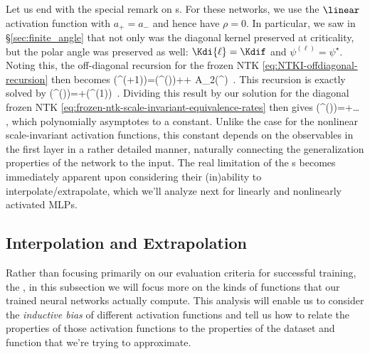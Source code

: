 Let us end with the special remark on s. For these networks, we use the $\linear$ activation function with $a_{+}=a_{-}$ and hence have $\rho=0$. In particular, we saw in \S\ref{sec:finite_angle} that not only was the diagonal kernel preserved at criticality, but the polar angle was preserved as well: $\Kdi{\ell}=\Kdif$ and $\psi^{(\ell)} = \psi^{\star}$. Noting this, the off-diagonal recursion for the frozen NTK \eqref{eq:NTKI-offdiagonal-recursion} then becomes
\be
{}\cos\!\le(\zeta^{(\ell+1)}\ri)=\NTKIdi{\ell}\cos\!\le(\zeta^{(\ell)}\ri)++ A_2\Kdif\cos\!\le(\psi^{\star}\ri)\, .
\ee
This recursion is exactly solved by
\be
\NTKIdi{\ell}\cos\!\le(\zeta^{(\ell)}\ri)=+\cos\!\le(\zeta^{(1)}\ri)\, .
\ee
Dividing this result by our solution for the diagonal frozen NTK \eqref{eq:frozen-ntk-scale-invariant-equivalence-rates} then gives
\be
\cos\!\le(\zeta^{(\ell)}\ri)=+\ldots\, ,
\ee
which polynomially asymptotes to a constant.
Unlike the case for the nonlinear scale-invariant activation functions, this constant depends on the observables in the first layer in a rather detailed manner, naturally connecting the generalization properties of the network to the input.
The real limitation of the s becomes immediately apparent upon considering their (in)ability to interpolate/extrapolate, which we'll analyze next for linearly and nonlinearly activated MLPs.






 
 





\subsection{Interpolation and Extrapolation}\label{subsec:star-polation}
Rather than focusing primarily on our evaluation criteria for successful training, the , in this subsection we will focus more on
the kinds of functions that our trained neural networks actually compute. This analysis will enable us to consider the \emph{inductive bias} of different activation functions and tell us how to relate the properties of those activation functions to the properties of the dataset and function that we're trying to approximate. 


